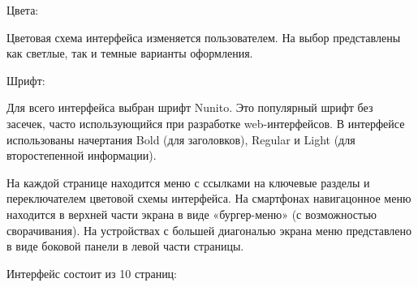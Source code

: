 \documentclass[project.tex]{subfiles}
\begin{document}
\par
Цвета:
\par
Цветовая схема интерфейса изменяется пользователем. На выбор представлены как светлые, так и темные варианты оформления.
\par
Шрифт:
\par
Для всего интерфейса выбран шрифт Nunito. Это популярный шрифт без засечек, часто использующийся при разработке web-интерфейсов. В интерфейсе использованы начертания Bold (для заголовков), Regular и Light (для второстепенной информации).
\par
На каждой странице находится меню с ссылками на ключевые разделы и переключателем цветовой схемы интерфейса. На смартфонах навигацонное меню находится в верхней части экрана в виде «бургер-меню» (с возможностью сворачивания).
На устройствах с большей диагональю экрана меню представлено в виде боковой панели в левой части страницы.
\par
Интерфейс состоит из 10 страниц:
\end{document}
